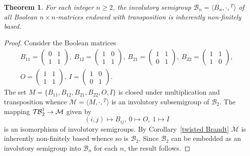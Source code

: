 \documentclass[11pt,reqno]{amsart}
\numberwithin{equation}{section}
\newtheorem{Thm}{Theorem}[section]
\theoremstyle{remark}
\def\cal{\mathcal}
\def\Bc{{\cal B}}
\def\TB{\ensuremath{\mathcal{T\kern-1pt B}_2^1}}
\begin{document}
\begin{Thm}
\label{Theorem 3.7} For each integer $n\ge 2$, the involutory
semigroup $\Bc_n=\langle B_n,\cdot,{}^T\rangle$ of all Boolean
$n\times n$-matrices endowed with transposition is inherently
non-finitely based.
\end{Thm}

\begin{proof} Consider the Boolean matrices
\begin{gather*}
B_{11}=\begin{pmatrix} 0&1\\1&1\end{pmatrix},\
B_{12}=\begin{pmatrix} 1&0\\1&1 \end{pmatrix},\
B_{21}=\begin{pmatrix} 1&1\\0&1 \end{pmatrix},\
B_{22}=\begin{pmatrix} 1&1\\1&0\end{pmatrix},\\
O=\begin{pmatrix} 1&1\\1&1 \end{pmatrix},\
I=\begin{pmatrix}1&0\\0&1 \end{pmatrix}.
\end{gather*}
The set $M=\{B_{11}, B_{12}, B_{21}, B_{22},O,I\}$ is closed under
multiplication and transposition whence $\mathcal{M}=\langle
M,\cdot,{}^T\rangle$ is an involutory subsemigroup of $\Bc_2$. The
mapping $\TB\to \mathcal{M}$ given by
$$ (i,j)\mapsto B_{ij},\ 0\mapsto O,\ 1\mapsto I$$
is an isomorphism of involutory semigroups. By
Corollary~\ref{twisted Brandt} $\mathcal{M}$ is inherently
non-finitely based whence so is $\Bc_2$. Since $\Bc_2$ can be
embedded as an involutory semigroup into $\Bc_n$ for each $n$, the
result follows.
\end{proof}
\end{document}
